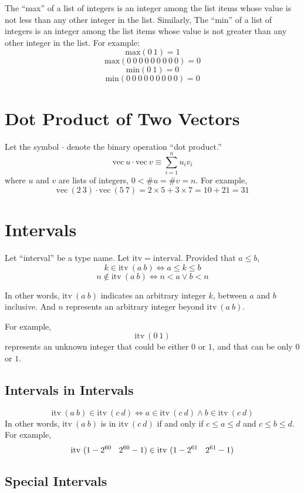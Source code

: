 \documentclass{article}
\begin{document}
The ``max'' of a list of integers is
an integer among the list items whose value is
not less than any other integer in the list.
Similarly,
The ``min'' of a list of integers is
an integer among the list items whose value is
not greater than any other integer in the list.
For example:
$$\mathrm{max}(0\ 1)=1$$
$$\mathrm{max}(0\ 0\ 0\ 0\ 0\ 0\ 0\ 0\ 0)=0$$
$$\mathrm{min}(0\ 1)=0$$
$$\mathrm{min}(0\ 0\ 0\ 0\ 0\ 0\ 0\ 0\ 0)=0$$

\section{Dot Product of Two Vectors}

Let the symbol $\cdot$ denote the binary operation ``dot product.''
$$\mathrm{vec}\ u \cdot \mathrm{vec}\ v
\equiv
\sum^n_{i=1}
u_i v_i$$
where $u$ and $v$ are lists of integers, $0<\#u=\#v=n$.
For example,
$$\mathrm{vec}\ (2\ 3)\cdot\mathrm{vec}\ (5\ 7)=2\times 5+3\times 7=10+21=31$$

\section{Intervals}

Let ``interval'' be a type name.
Let $\mathrm{itv}=\mathrm{interval}$. Provided that $a\le b$,
$$k\in \mathrm{itv}\ (a\ b) \Leftrightarrow a \le k \le b$$
$$n\not\in \mathrm{itv}\ (a\ b) \Leftrightarrow n<a \vee b<n$$

\noindent
In other words, $\mathrm{itv}\ (a\ b)$ indicates an arbitrary integer $k$,
between $a$ and $b$ inclusive.
And $n$ represents an arbitrary integer
beyond $\mathrm{itv}\ (a\ b)$.

For example,
$$\mathrm{itv}\ (0\ 1)$$
represents an unknown integer that could be either $0$ or $1$,
and that can be only $0$ or $1$.

\subsection{Intervals in Intervals}

$$\mathrm{itv}\ (a\ b)\in \mathrm{itv}\ (c\ d)\Leftrightarrow a\in \mathrm{itv}\ (c\ d)\wedge b\in \mathrm{itv}\ (c\ d)$$
In other words, $\mathrm{itv}\ (a\ b)$ is in $\mathrm{itv}\ (c\ d)$
if and only if
$c\le a\le d$ and
$c\le b\le d$.
For example,
$$\mathrm{itv}\ (1-2^{60}\en 2^{60}-1)\in \mathrm{itv}\ (1-2^{61}\en 2^{61}-1)$$

\subsection{Special Intervals}
\end{document}
